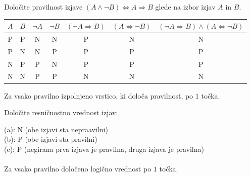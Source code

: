 \documentclass[addpoints]{exam}
\begin{document}
\begin{questions}

    
    \question[4]
    Določite pravilnost izjave $( A \land  \lnot B)\Leftrightarrow A\Rightarrow  B$ glede na izbor izjav $A$ in $B$.

    \begin{solution}[12cm]
        \begin{table}[H]
            \begin{tabular}{ccccccc}
             $A$ & $B$ & $\lnot A$ & $\lnot B$ & $(\lnot A\Rightarrow B)$ & $(A\Leftrightarrow \lnot B)$ & $(\lnot A\Rightarrow B)\land(A\Leftrightarrow \lnot B)$\\ \hline
             P & P & N & N & P & N & N \\ 
             P & N & N & P & P & P & P \\
             N & P & P & N & P & P & P \\
             N & N & P & P & N & N & N
            \end{tabular}
        \end{table}
        Za vsako pravilno izpolnjeno vrstico, ki določa pravilnost, po $1$ točka.
    \end{solution}




    \question[3]
    Določite resničnostno vrednost izjav:

    \begin{solution}
        (a): N (obe izjavi sta nepraavilni) \\
        (b): P (obe izjavi sta pravilni) \\
        (c): P (negirana prva izjava je pravilna, druga izjava je pravilna) \\ \\
        Za vsako pravilno določeno logično vrednost po $1$ točka.
    \end{solution}




\end{questions}
\end{document}
